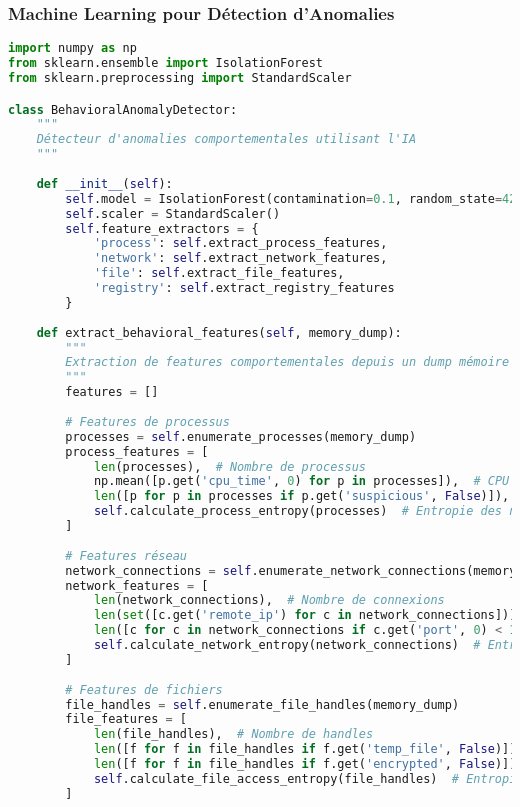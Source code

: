 \subsubsection{Machine Learning pour Détection d'Anomalies}

\begin{lstlisting}[language=Python, caption=Détecteur d'anomalies comportementales avec IA]
import numpy as np
from sklearn.ensemble import IsolationForest
from sklearn.preprocessing import StandardScaler

class BehavioralAnomalyDetector:
    """
    Détecteur d'anomalies comportementales utilisant l'IA
    """
    
    def __init__(self):
        self.model = IsolationForest(contamination=0.1, random_state=42)
        self.scaler = StandardScaler()
        self.feature_extractors = {
            'process': self.extract_process_features,
            'network': self.extract_network_features,
            'file': self.extract_file_features,
            'registry': self.extract_registry_features
        }
        
    def extract_behavioral_features(self, memory_dump):
        """
        Extraction de features comportementales depuis un dump mémoire
        """
        features = []
        
        # Features de processus
        processes = self.enumerate_processes(memory_dump)
        process_features = [
            len(processes),  # Nombre de processus
            np.mean([p.get('cpu_time', 0) for p in processes]),  # CPU moyen
            len([p for p in processes if p.get('suspicious', False)]),  # Processus suspects
            self.calculate_process_entropy(processes)  # Entropie des noms
        ]
        
        # Features réseau
        network_connections = self.enumerate_network_connections(memory_dump)
        network_features = [
            len(network_connections),  # Nombre de connexions
            len(set([c.get('remote_ip') for c in network_connections])),  # IPs uniques
            len([c for c in network_connections if c.get('port', 0) < 1024]),  # Ports privilégiés
            self.calculate_network_entropy(network_connections)  # Entropie réseau
        ]
        
        # Features de fichiers
        file_handles = self.enumerate_file_handles(memory_dump)
        file_features = [
            len(file_handles),  # Nombre de handles
            len([f for f in file_handles if f.get('temp_file', False)]),  # Fichiers temporaires
            len([f for f in file_handles if f.get('encrypted', False)]),  # Fichiers chiffrés
            self.calculate_file_access_entropy(file_handles)  # Entropie d'accès
        ]
        

\end{lstlisting}
